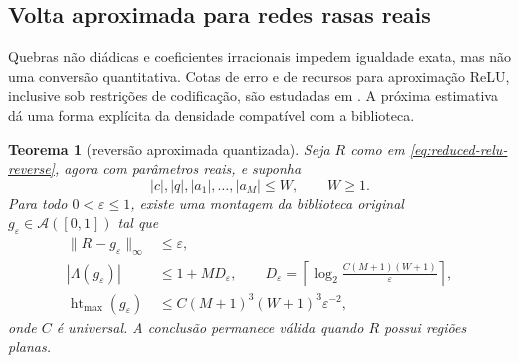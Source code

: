 \documentclass[11pt,a4paper]{article}
\newtheorem{theorem}{Teorema}[section]
\theoremstyle{definition}
\theoremstyle{remark}
\newcommand{\Aclass}{\mathcal{A}}
\newcommand{\height}{\operatorname{ht}}
\begin{document}
\subsection{Volta aproximada para redes rasas reais}

Quebras não diádicas e coeficientes irracionais impedem igualdade exata, mas
não uma conversão quantitativa. Cotas de erro e de recursos para aproximação
ReLU, inclusive sob restrições de codificação, são estudadas em
\citet{yarotsky2017,bolcskei2019}. A próxima estimativa dá uma forma explícita
da densidade compatível com a biblioteca.

\begin{theorem}[reversão aproximada quantizada]
\label{thm:quantized-approximate-reverse}
Seja $R$ como em \eqref{eq:reduced-relu-reverse}, agora com parâmetros reais,
e suponha
\begin{equation}
 |c|,|q|,|a_1|,\ldots,|a_M|\le W,
 \qquad W\ge1.
 \label{eq:real-network-weight-bound}
\end{equation}
Para todo $0<\varepsilon\le1$, existe uma montagem da biblioteca original
$g_\varepsilon\in\Aclass([0,1])$ tal que
\begin{align}
 \|R-g_\varepsilon\|_\infty&\le\varepsilon,
 \label{eq:approximate-reverse-error}\\
 |\Lambda(g_\varepsilon)|&\le1+MD_\varepsilon,
 \qquad
 D_\varepsilon=
 \left\lceil\log_2\frac{C(M+1)(W+1)}{\varepsilon}\right\rceil,
 \label{eq:approximate-reverse-leaves}\\
 \height_{\max}(g_\varepsilon)
 &\le
 C(M+1)^3(W+1)^3\varepsilon^{-2},
 \label{eq:approximate-reverse-height}
\end{align}
onde $C$ é universal. A conclusão permanece válida quando $R$ possui regiões
planas.
\end{theorem}
\end{document}
